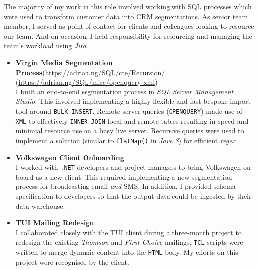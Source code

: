 \documentclass[letterpaper,11pt]{article}
\newcommand{\resumeItem}[3]{
	\item\small{
		\textbf{#1}\hfill\tiny{#2\\}\small{ #3 \vspace{-2pt}}
	}
}
\newcommand{\resumeItemListStart}{\begin{itemize}}
\newcommand{\resumeItemListEnd}{\end{itemize}\vspace{-5pt}}
\begin{document}
The majority of my work in this role involved working with SQL processes which were used to transform customer data into CRM segmentations. As senior team member, I served as point of contact for clients and colleagues looking to resource our team. And on occasion, I held responsibility for resourcing and managing the team's workload using \textit{Jira}.

\resumeItemListStart
\resumeItem{Virgin Media Segmentation Process}{(\href{https://adrian.ng/SQL/cte/Recursion/}{https://adrian.ng/SQL/cte/Recursion/}
\quad (\href{https://adrian.ng/SQL/misc/openquery-xml}{https://adrian.ng/SQL/misc/openquery-xml})}
{
	I built an end-to-end segmentation process in \textit{SQL Server Management Studio}. This involved implementing a highly flexible and fast bespoke import tool around \texttt{BULK INSERT}. Remote server queries (\texttt{OPENQUERY}) made use of \texttt{XML} to effectively \texttt{INNER JOIN} local and remote tables resulting in speed and minimial resource use on a busy live server. Recursive queries were used to implement a solution (similar to \texttt{flatMap()} in \textit{Java 8}) for efficient \textit{regex}.
	\newline
}
\resumeItem{Volkswagen Client Onboarding}{}
{
	I worked with \texttt{.NET} developers and project managers to bring Volkswagen on-board as a new client. This required implementing a new segmentation process for broadcasting email \textit{and} SMS. In addition, I provided schema specification to developers so that the output data could be ingested by their data warehouse.
	\newline
}
\resumeItem{TUI Mailing Redesign}{}
{
	I collaborated closely with the TUI client during a three-month project to redesign the existing \textit{Thomson} and \textit{First Choice} mailings.	\texttt{TCL} scripts were written to merge dynamic content into the \texttt{HTML} body. 
	My efforts on this project were recognised by the client.
	\newline
}

\resumeItemListEnd
\end{document}
